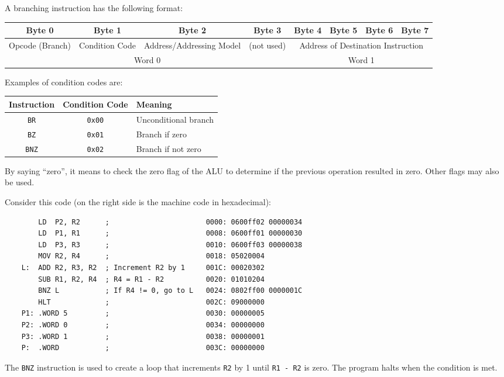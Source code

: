 \begin{enumerate}
A branching instruction has the following format:
\begin{table}[H]
    \centering
    \begin{tabular}{ccccclll}
    Byte 0                                & Byte 1                              & Byte 2                                         & Byte 3                          & Byte 4     & Byte 5     & Byte 6     & Byte 7    \\ \hline
    \multicolumn{1}{|c|}{Opcode (Branch)} & \multicolumn{1}{c|}{Condition Code} & \multicolumn{1}{c|}{Address/Addressing Model} & \multicolumn{1}{c|}{(not used)} & \multicolumn{4}{c|}{Address of Destination Instruction} \\ \hline
    \multicolumn{4}{c}{Word 0}                                                                                                                                     & \multicolumn{4}{c}{Word 1}                      
    \end{tabular}
\end{table}

Examples of condition codes are:
\begin{table}[H]
    \centering
    \begin{tabular}{|c|c|l|}
    \hline
    \textbf{Instruction} & \textbf{Condition Code} & \textbf{Meaning} \\ \hline
    \texttt{BR} & \texttt{0x00} & Unconditional branch \\ \hline
    \texttt{BZ} & \texttt{0x01} & Branch if zero \\ \hline
    \texttt{BNZ} & \texttt{0x02} & Branch if not zero \\ \hline
    \end{tabular}
\end{table}
By saying ``zero'', it means to check the zero flag of the ALU to determine if the previous
operation resulted in zero. Other flags may also be used.

\begin{example}
    Consider this code (on the right side is the machine code in hexadecimal):
    \begin{verbatim}
        LD  P2, R2      ;                       0000: 0600ff02 00000034
        LD  P1, R1      ;                       0008: 0600ff01 00000030
        LD  P3, R3      ;                       0010: 0600ff03 00000038
        MOV R2, R4      ;                       0018: 05020004
    L:  ADD R2, R3, R2  ; Increment R2 by 1     001C: 00020302
        SUB R1, R2, R4  ; R4 = R1 - R2          0020: 01010204
        BNZ L           ; If R4 != 0, go to L   0024: 0802ff00 0000001C
        HLT             ;                       002C: 09000000 
    P1: .WORD 5         ;                       0030: 00000005
    P2: .WORD 0         ;                       0034: 00000000
    P3: .WORD 1         ;                       0038: 00000001
    P:  .WORD           ;                       003C: 00000000
    \end{verbatim}
    The \texttt{BNZ} instruction is used to create a loop that increments \texttt{R2} by 1
    until \texttt{R1 - R2} is zero. The program halts when the condition is met.
\end{example}


\end{enumerate}
